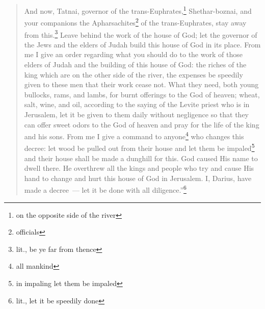 \begin{quotation}
\begin{inparaenum}
         And now, Tatnai, governor of the trans-Euphrates,\footnote{on the opposite side of the river} Shethar-boznai, and your companions the Apharsachites\footnote{officials} of the trans-Euphrates, stay away from this.\footnote{lit., be ye far from thence}%
         Leave behind the work of the house of God; let the governor of the Jews and the elders of Judah build this house of God in its place.%
         From me I give an order regarding what you should do to the work of those elders of Judah and the building of this house of God: the riches of the king which are on the other side of the river, the expenses be speedily given to these men that their work cease not.%
         What they need, both young bullocks, rams, and lambs, for burnt offerings to the God of heaven; wheat, salt, wine, and oil, according to the saying of the Levite priest who is in Jerusalem, let it be given to them daily without negligence%
         so that they can offer sweet odors to the God of heaven and pray for the life of the king and his sons.%
         From me I give a command to anyone\footnote{all mankind} who changes this decree: let wood be pulled out from their house and let them be impaled\footnote{in impaling let them be impaled} and their house shall be made a dunghill for this.%
         God caused His name to dwell there. He overthrew all the kings and people who try and cause His hand to change and hurt this house of God in Jerusalem. I, Darius, have made a decree~--- let it be done with all diligence.''\footnote{lit., let it be speedily done}%
    \end{inparaenum}
\end{quotation}

